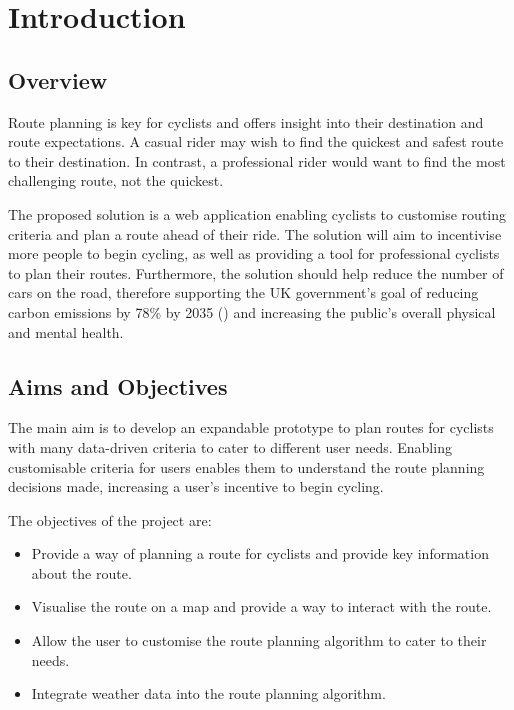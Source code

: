 \chapter{Introduction}
\label{chap:intro}

\section{Overview}
\label{intro:overview}

Route planning is key for cyclists and offers insight into their destination and route expectations. A casual rider may wish to find the quickest and safest route to their destination. In contrast, a professional rider would want to find the most challenging route, not the quickest.

The proposed solution is a web application enabling cyclists to customise routing criteria and plan a route ahead of their ride. The solution will aim to incentivise more people to begin cycling, as well as providing a tool for professional cyclists to plan their routes. Furthermore, the solution should help reduce the number of cars on the road, therefore supporting the UK government's goal of reducing carbon emissions by 78\% by 2035 (\cite{govuk_net_2022}) and increasing the public's overall physical and mental health.

\section{Aims and Objectives}
\label{intro:aimsandobjectives}

The main aim is to develop an expandable prototype to plan routes for cyclists with many data-driven criteria to cater to different user needs. Enabling customisable criteria for users enables them to understand the route planning decisions made, increasing a user's incentive to begin cycling.
 
The objectives of the project are:
\begin{itemize}
    \item Provide a way of planning a route for cyclists and provide key information about the route.
    \item Visualise the route on a map and provide a way to interact with the route.
    \item Allow the user to customise the route planning algorithm to cater to their needs.
    \item Integrate weather data into the route planning algorithm.
\end{itemize}

